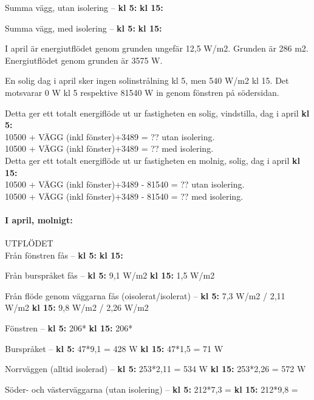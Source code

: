 Summa vägg, utan isolering –
\textbf{kl 5:} 
\textbf{kl 15:} 

Summa vägg, med isolering –
\textbf{kl 5:} 
\textbf{kl 15:} 

I april är energiutflödet genom grunden ungefär 12,5 W/m2. Grunden är 286 m2.\\
Energiutflödet genom grunden är 3575 W.

En solig dag i april sker ingen solinstrålning kl 5, men 540 W/m2 kl 15. Det motsvarar 0 W kl 5 respektive 81540 W in genom fönstren på södersidan.

Detta ger ett totalt energiflöde ut ur fastigheten en solig, vindstilla, dag i april \textbf{kl 5:}\\
10500 + VÄGG (inkl fönster)+3489 = ?? utan isolering.\\
10500 + VÄGG (inkl fönster)+3489 = ?? med isolering.\\

Detta ger ett totalt energiflöde ut ur fastigheten en molnig, solig, dag i april \textbf{kl 15:}\\
10500 + VÄGG (inkl fönster)+3489 - 81540 = ?? utan isolering.\\
10500 + VÄGG (inkl fönster)+3489 - 81540 = ?? med isolering.\\



\paragraph{I april, molnigt:}
UTFLÖDET\\

Från fönstren fås –
\textbf{kl 5:} 
\textbf{kl 15:} 

Från burspråket fås –
\textbf{kl 5:} 9,1 W/m2
\textbf{kl 15:} 1,5 W/m2

Från flöde genom väggarna fås (oisolerat/isolerat) –
\textbf{kl 5:} 7,3 W/m2 / 2,11 W/m2
\textbf{kl 15:} 9,8 W/m2 / 2,26 W/m2


Fönstren –
\textbf{kl 5:} 206*
\textbf{kl 15:} 206*

Burspråket – 
\textbf{kl 5:} 47*9,1 = 428 W
\textbf{kl 15:} 47*1,5 = 71 W

Norrväggen (alltid isolerad) –
\textbf{kl 5:} 253*2,11 = 534 W
\textbf{kl 15:} 253*2,26 = 572 W

Söder- och västerväggarna (utan isolering) –
\textbf{kl 5:} 212*7,3 = 
\textbf{kl 15:} 212*9,8 = 

